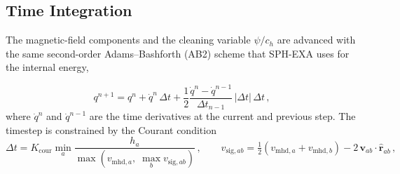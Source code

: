 

\subsection{Time Integration}
\label{sec:timeint}

The magnetic-field components and the cleaning variable $\psi/c_h$ are advanced with the same second-order Adams--Bashforth (AB2) scheme that SPH-EXA uses for the internal energy,

\begin{equation}
    q^{n+1} = q^n + \dot{q}^n \, \Delta t + \frac{1}{2}\frac{\dot{q}^n - \dot{q}^{n-1}}{\Delta t_{n-1}}\, |\Delta t|\, \Delta t\,,
    \label{eq:ab2}
\end{equation}
where $\dot{q}^{n}$ and $\dot{q}^{n-1}$ are the time derivatives at the current and previous step. The timestep is constrained by the Courant condition
\begin{equation}
    \Delta t = K_\mathrm{cour} \min_a \frac{h_a}{\max\!\left(v_{\mathrm{mhd},a},\; \max_b v_{\mathrm{sig},ab}\right)}\,, \qquad
    v_{\mathrm{sig},ab} = \tfrac{1}{2}\left(v_{\mathrm{mhd},a} + v_{\mathrm{mhd},b}\right) - 2\,\mathbf{v}_{ab}\cdot\hat{\mathbf{r}}_{ab}\,,
    \label{eq:cfl}
\end{equation}


